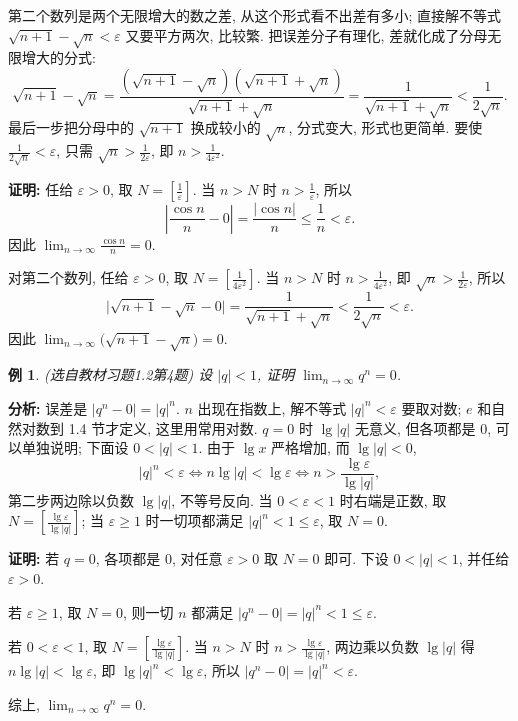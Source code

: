 \documentclass[UTF8,openany]{ctexbook}
\theoremstyle{chinesetextbook}
\newtheorem{example}{例}[section]
\newenvironment{cnproof}{\par\indent\textbf{证明:} \ignorespaces}{\par}
\begin{document}
第二个数列是两个无限增大的数之差, 从这个形式看不出差有多小; 直接解不等式 $\sqrt{n+1}-\sqrt n<\varepsilon$ 又要平方两次, 比较繁. 把误差分子有理化, 差就化成了分母无限增大的分式:
\[
\sqrt{n+1}-\sqrt n=\frac{(\sqrt{n+1}-\sqrt n)(\sqrt{n+1}+\sqrt n)}{\sqrt{n+1}+\sqrt n}=\frac1{\sqrt{n+1}+\sqrt n}<\frac1{2\sqrt n}.
\]
最后一步把分母中的 $\sqrt{n+1}$ 换成较小的 $\sqrt n$, 分式变大, 形式也更简单. 要使 $\displaystyle\frac1{2\sqrt n}<\varepsilon$, 只需 $\displaystyle\sqrt n>\frac1{2\varepsilon}$, 即 $\displaystyle n>\frac1{4\varepsilon^2}$.
\begin{cnproof}
任给 $\varepsilon>0$, 取 $\displaystyle N=\left[\frac1\varepsilon\right]$. 当 $n>N$ 时 $\displaystyle n>\frac1\varepsilon$, 所以
\[
\left|\frac{\cos n}n-0\right|=\frac{|\cos n|}n\le\frac1n<\varepsilon.
\]
因此 $\displaystyle\lim_{n\to\infty}\frac{\cos n}n=0$.

对第二个数列, 任给 $\varepsilon>0$, 取 $\displaystyle N=\left[\frac1{4\varepsilon^2}\right]$. 当 $n>N$ 时 $\displaystyle n>\frac1{4\varepsilon^2}$, 即 $\displaystyle\sqrt n>\frac1{2\varepsilon}$, 所以
\[
\bigl|\sqrt{n+1}-\sqrt n-0\bigr|=\frac1{\sqrt{n+1}+\sqrt n}<\frac1{2\sqrt n}<\varepsilon.
\]
因此 $\displaystyle\lim_{n\to\infty}\bigl(\sqrt{n+1}-\sqrt n\bigr)=0$.
\end{cnproof}
\begin{example}\label{ex:h12-4}
\textnormal{(选自教材习题1.2第4题)} 设 $|q|<1$, 证明 $\displaystyle\lim_{n\to\infty}q^n=0$.
\end{example}
\par\indent\textbf{分析:} 误差是 $|q^n-0|=|q|^n$. $n$ 出现在指数上, 解不等式 $|q|^n<\varepsilon$ 要取对数; $e$ 和自然对数到 1.4 节才定义, 这里用常用对数. $q=0$ 时 $\lg|q|$ 无意义, 但各项都是 $0$, 可以单独说明; 下面设 $0<|q|<1$. 由于 $\lg x$ 严格增加, 而 $\lg|q|<0$,
\[
|q|^n<\varepsilon\iff n\lg|q|<\lg\varepsilon\iff n>\frac{\lg\varepsilon}{\lg|q|},
\]
第二步两边除以负数 $\lg|q|$, 不等号反向. 当 $0<\varepsilon<1$ 时右端是正数, 取 $\displaystyle N=\left[\frac{\lg\varepsilon}{\lg|q|}\right]$; 当 $\varepsilon\ge1$ 时一切项都满足 $|q|^n<1\le\varepsilon$, 取 $N=0$.
\begin{cnproof}
若 $q=0$, 各项都是 $0$, 对任意 $\varepsilon>0$ 取 $N=0$ 即可. 下设 $0<|q|<1$, 并任给 $\varepsilon>0$.

若 $\varepsilon\ge1$, 取 $N=0$, 则一切 $n$ 都满足 $|q^n-0|=|q|^n<1\le\varepsilon$.

若 $0<\varepsilon<1$, 取 $\displaystyle N=\left[\frac{\lg\varepsilon}{\lg|q|}\right]$. 当 $n>N$ 时 $\displaystyle n>\frac{\lg\varepsilon}{\lg|q|}$, 两边乘以负数 $\lg|q|$ 得 $n\lg|q|<\lg\varepsilon$, 即 $\lg|q|^n<\lg\varepsilon$, 所以 $|q^n-0|=|q|^n<\varepsilon$.

综上, $\displaystyle\lim_{n\to\infty}q^n=0$.
\end{cnproof}
\end{document}
